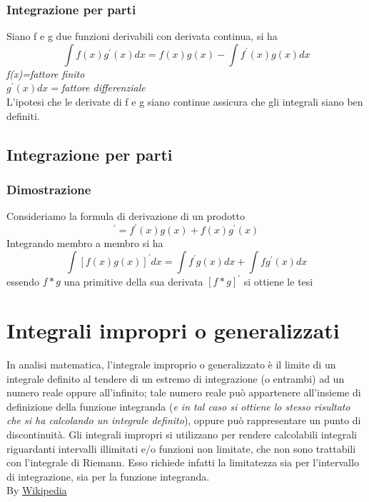 \documentclass{book}
\begin{document}
\subsubsection{Integrazione per parti}
Siano f e g due funzioni derivabili con derivata continua, si ha
\begin{equation*}
	\int f(x)g^\prime(x)dx=f(x)g(x)-\int f^\prime (x)g(x)dx
\end{equation*}
\textit{f(x)=fattore finito}\\
$g^\prime(x)dx=$\textit{fattore differenziale}\\
L'ipotesi che le derivate di f e g siano continue assicura che gli integrali siano ben definiti.
\subsection{Integrazione per parti}
\subsubsection{Dimostrazione}
Consideriamo la formula di derivazione di un prodotto
\begin{equation*}
	[f(x)g(x)]^\prime=f^\prime (x)g(x)+f(x)g^\prime(x)
\end{equation*}
Integrando membro a membro si ha
\begin{equation*}
	\int [f(x)g(x)]^\prime dx=\int f^\prime g(x)dx+\int f g^\prime(x)dx
\end{equation*}
essendo $f*g$ una primitive della sua derivata $[f*g]^\prime$ si ottiene le tesi 

\section{Integrali impropri o generalizzati}
In analisi matematica, l'integrale improprio o generalizzato è il limite di un integrale definito al tendere di un estremo di integrazione (o entrambi) ad un numero reale oppure all'infinito; tale numero reale può appartenere all'insieme di definizione della funzione integranda (\textit{e in tal caso si ottiene lo stesso risultato che si ha calcolando un integrale definito}), oppure può rappresentare un punto di discontinuità. Gli integrali impropri si utilizzano per rendere calcolabili integrali riguardanti intervalli illimitati e/o funzioni non limitate, che non sono trattabili con l'integrale di Riemann. Esso richiede infatti la limitatezza sia per l'intervallo di integrazione, sia per la funzione integranda.\\ By \href{https://it.wikipedia.org/wiki/Integrale_improprio}{Wikipedia}

\printindex
\end{document}
